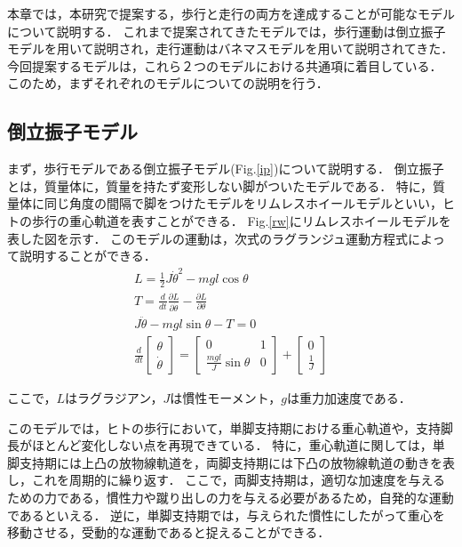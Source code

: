 本章では，本研究で提案する，歩行と走行の両方を達成することが可能なモデルについて説明する．
これまで提案されてきたモデルでは，歩行運動は倒立振子モデルを用いて説明され，走行運動はバネマスモデルを用いて説明されてきた．
今回提案するモデルは，これら２つのモデルにおける共通項に着目している．
このため，まずそれぞれのモデルについての説明を行う．

\subsection{倒立振子モデル}
まず，歩行モデルである倒立振子モデル(Fig.\ref{ip})について説明する．
倒立振子とは，質量体に，質量を持たず変形しない脚がついたモデルである．
特に，質量体に同じ角度の間隔で脚をつけたモデルをリムレスホイールモデルといい，ヒトの歩行の重心軌道を表すことができる\cite{doi:10.1080/02681119708806242}．
Fig.\ref{rw}にリムレスホイールモデルを表した図を示す．
このモデルの運動は，次式のラグランジュ運動方程式によって説明することができる．
\begin{gather}
  L = \frac{1}{2}J\dot{\theta}^2 - mgl\cos{\theta} \\
 T = \frac{d}{dt}\frac{\partial L}{\partial \dot{\theta}} - \frac{\partial L}{\partial \theta} \\
 J\ddot{\theta} - mgl\sin{\theta} - T = 0 \\
 \frac{d}{dt} \left[
    \begin{array}{cc}
      \theta \\
      \dot{\theta}
    \end{array}
  \right] = \left[
    \begin{array}{cc}
      0 & 1 \\
      \frac{mgl}{J} \sin{\theta} & 0
    \end{array}
  \right] + \left[
    \begin{array}{cc}
      0 \\
     \frac{1}{J}
    \end{array}
  \right]
\end{gather}

ここで，\(L\)はラグラジアン，\(J\)は慣性モーメント，\(g\)は重力加速度である．

このモデルでは，ヒトの歩行において，単脚支持期における重心軌道や，支持脚長がほとんど変化しない点を再現できている．
特に，重心軌道に関しては，単脚支持期には上凸の放物線軌道を，両脚支持期には下凸の放物線軌道の動きを表し，これを周期的に繰り返す．
ここで，両脚支持期は，適切な加速度を与えるための力である，慣性力や蹴り出しの力を与える必要があるため，自発的な運動であるといえる．
逆に，単脚支持期では，与えられた慣性にしたがって重心を移動させる，受動的な運動であると捉えることができる．

